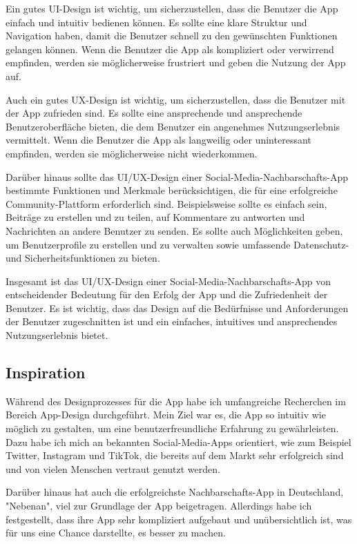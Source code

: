 Ein gutes UI-Design ist wichtig, um sicherzustellen, dass die Benutzer die App einfach und intuitiv bedienen können. Es sollte eine klare Struktur und Navigation haben, damit die Benutzer schnell zu den gewünschten Funktionen gelangen können. Wenn die Benutzer die App als kompliziert oder verwirrend empfinden, werden sie möglicherweise frustriert und geben die Nutzung der App auf.

Auch ein gutes UX-Design ist wichtig, um sicherzustellen, dass die Benutzer mit der App zufrieden sind. Es sollte eine ansprechende und ansprechende Benutzeroberfläche bieten, die dem Benutzer ein angenehmes Nutzungserlebnis vermittelt. Wenn die Benutzer die App als langweilig oder uninteressant empfinden, werden sie möglicherweise nicht wiederkommen.

Darüber hinaus sollte das UI/UX-Design einer Social-Media-Nachbarschafts-App bestimmte Funktionen und Merkmale berücksichtigen, die für eine erfolgreiche Community-Plattform erforderlich sind. Beispielsweise sollte es einfach sein, Beiträge zu erstellen und zu teilen, auf Kommentare zu antworten und Nachrichten an andere Benutzer zu senden. Es sollte auch Möglichkeiten geben, um Benutzerprofile zu erstellen und zu verwalten sowie umfassende Datenschutz- und Sicherheitsfunktionen zu bieten.

Insgesamt ist das UI/UX-Design einer Social-Media-Nachbarschafts-App von entscheidender Bedeutung für den Erfolg der App und die Zufriedenheit der Benutzer. Es ist wichtig, dass das Design auf die Bedürfnisse und Anforderungen der Benutzer zugeschnitten ist und ein einfaches, intuitives und ansprechendes Nutzungserlebnis bietet.
\author{Martin Hausleitner}
\subsection{Inspiration}
Während des Designprozesses für die App habe ich umfangreiche Recherchen im Bereich App-Design durchgeführt. Mein Ziel war es, die App so intuitiv wie möglich zu gestalten, um eine benutzerfreundliche Erfahrung zu gewährleisten. Dazu habe ich mich an bekannten Social-Media-Apps orientiert, wie zum Beispiel Twitter, Instagram und TikTok, die bereits auf dem Markt sehr erfolgreich sind und von vielen Menschen vertraut genutzt werden.

Darüber hinaus hat auch die erfolgreichste Nachbarschafts-App in Deutschland, "Nebenan", viel zur Grundlage der App beigetragen. Allerdings habe ich festgestellt, dass ihre App sehr kompliziert aufgebaut und unübersichtlich ist, was für uns eine Chance darstellte, es besser zu machen.

